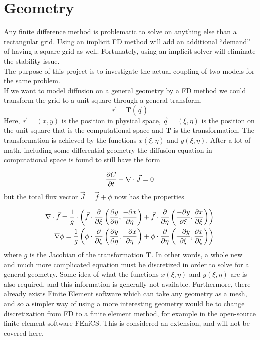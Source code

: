 \section{Geometry}\label{geometry}
Any finite difference method is problematic to solve on anything else than a rectangular grid. 
Using an implicit FD method will add an additional ``demand'' of having a square grid as well. 
Fortunately, using an implicit solver will eliminate the stability issue. \\
The purpose of this project is to investigate the actual coupling of two models for the same problem. \\
If we want to model diffusion on a general geometry by a FD method we could transform the grid to a unit-square through a general transform.
\begin{equation*}
 \vec{r} = \mathbf{T}(\vec{q})
\end{equation*}
Here, $\vec{r} = (x,y)$ is the position in physical space, $\vec{q} = (\xi,\eta)$ is the position on the unit-square that is the computational space and $\mathbf{T}$  is the transformation. The transformation is achieved by the functions $x(\xi,\eta)$ and $y(\xi,\eta)$. 
After a lot of math, including some differential geometry the diffusion equation in computational space is found to still have the form

\begin{equation*}
 \frac{\partial C}{\partial t} -\nabla\cdot\vec{J} = 0
\end{equation*}
but the total flux vector $\vec{J} = \vec{f} + \phi$ now has the properties

\begin{align*}
 \nabla\cdot\vec{f} = \frac{1}{g}\cdot\left(\vec{f}\cdot\frac{\partial}{\partial\xi}\left(\frac{\partial y}{\partial\eta},\frac{-\partial x}{\partial \eta}\right) + \vec{f}\cdot\frac{\partial}{\partial\eta}\left(\frac{-\partial y}{\partial\xi},\frac{\partial x}{\partial \xi}\right)\right) \\
 \nabla\phi = \frac{1}{g}\left(\phi\cdot\frac{\partial}{\partial\xi}\left(\frac{\partial y}{\partial\eta},\frac{-\partial x}{\partial\eta}\right)+\phi\cdot\frac{\partial}{\partial\eta}\left(\frac{-\partial y}{\partial\xi},\frac{\partial x}{\partial\xi}\right)\right)
\end{align*}
where $g$ is the Jacobian of the transformation $\mathbf{T}$. 
In other words, a whole new and much more complicated equation must be discretized in order to solve for a general geometry. 
Some idea of what the functions $x(\xi,\eta)$ and $y(\xi,\eta)$ are is also required, and this information is generally not available. 
Furthermore, there already exists Finite Element software which can take any geometry as a mesh, and so a simpler way of using a more interesting geometry would be to change discretization from FD to a finite element method, for example in the open-source finite element software FEniCS. 
This is considered an extension, and will not be covered here.
